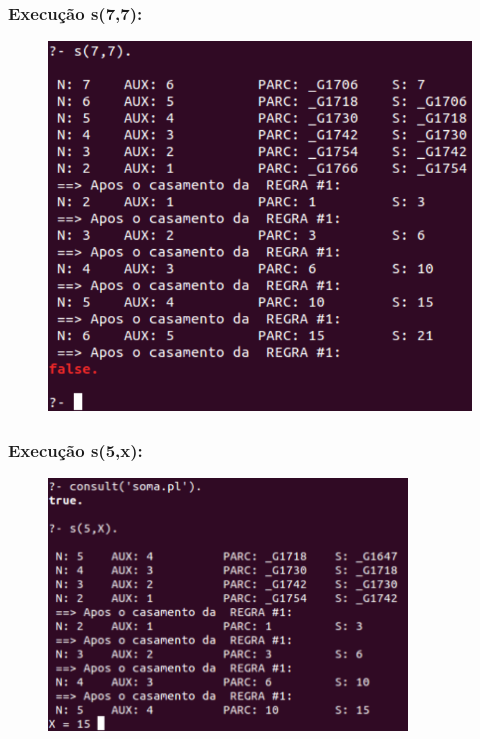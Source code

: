 \documentclass[sans]{beamer}
\begin{document}
\begin{frame}
\frametitle{Execução s(7,7):}

\begin{figure}[!htb]
\centering
\includegraphics[scale = 0.65]{figuras/soma1.pdf}
\label{soma1}
\end{figure}

  
\end{frame}


\begin{frame}
\frametitle{Execução s(5,x):}

\begin{figure}[!htb]
\centering
\includegraphics[width=0.85\textwidth , height=0.65\textheight]{figuras/soma2.pdf}
\label{soma2}
\end{figure}
 
\end{frame}
\end{document}
